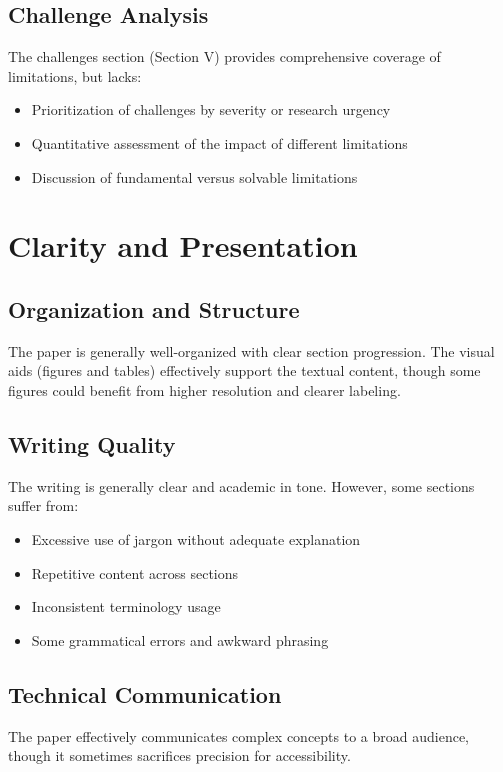 \documentclass[12pt]{article}
\begin{document}
{\subsection{Challenge Analysis}
The challenges section (Section V) provides comprehensive coverage of limitations, but lacks:

\begin{itemize}
\item Prioritization of challenges by severity or research urgency
\item Quantitative assessment of the impact of different limitations
\item Discussion of fundamental versus solvable limitations
\end{itemize}

\section{Clarity and Presentation}

\subsection{Organization and Structure}
The paper is generally well-organized with clear section progression. The visual aids (figures and tables) effectively support the textual content, though some figures could benefit from higher resolution and clearer labeling.

\subsection{Writing Quality}
The writing is generally clear and academic in tone. However, some sections suffer from:

\begin{itemize}
\item Excessive use of jargon without adequate explanation
\item Repetitive content across sections
\item Inconsistent terminology usage
\item Some grammatical errors and awkward phrasing
\end{itemize}

\subsection{Technical Communication}
The paper effectively communicates complex concepts to a broad audience, though it sometimes sacrifices precision for accessibility.

}
\end{document}
